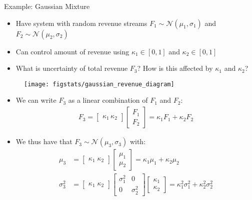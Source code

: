 \documentclass[9pt]{beamer}
\begin{document}
%
\begin{frame}{Example: Gaussian Mixture}
\begin{block}{}
\begin{itemize}
\item Have system with random revenue streams $F_1\sim\mathcal{N}(\mu_1,\sigma_1)$ and $F_2\sim\mathcal{N}(\mu_2,\sigma_2)$
\item Can control amount of revenue using $\kappa_1\in [0,1]$ and $\kappa_2\in [0,1]$
\item What is uncertainty of total revenue $F_3$? How is this affected by $\kappa_1$ and $\kappa_2$? 
\end{itemize}
\end{block}

\begin{figure}[!htb]
    \centering
	\texttt{[image: figstats/gaussian\_revenue\_diagram]}
\end{figure}
\pause 
\begin{itemize}
\item We can write $F_3$ as a linear combination of $F_1$ and $F_2$:
\begin{align*}
F_3=\left[\begin{array}{c} \kappa_1\, \kappa_2
\end{array}\right]\left[\begin{array}{c} F_1\\ F_2
\end{array}\right]=\kappa_1F_1+\kappa_2F_2
\end{align*}
\item We thus have that $F_3\sim\mathcal{N}(\mu_3,\sigma_3)$ with:
\begin{align*}
\mu_3&=\left[\begin{array}{c} \kappa_1\; \kappa_2
\end{array}\right]\left[\begin{array}{c} \mu_1\\ \mu_2
\end{array}\right]=\kappa_1\mu_1+\kappa_2\mu_2\\
\sigma_3^2&=\left[\begin{array}{c} \kappa_1\; \kappa_2
\end{array}\right]\left[\begin{array}{cc} \sigma_1^2&0\\0&\sigma_2^2
\end{array}\right]
\left[\begin{array}{c} \kappa_1\\ \kappa_2
\end{array}\right]=\kappa_1^2\sigma_1^2+\kappa_2^2\sigma_2^2
\end{align*}
\end{itemize}


\end{frame}
\end{document}
